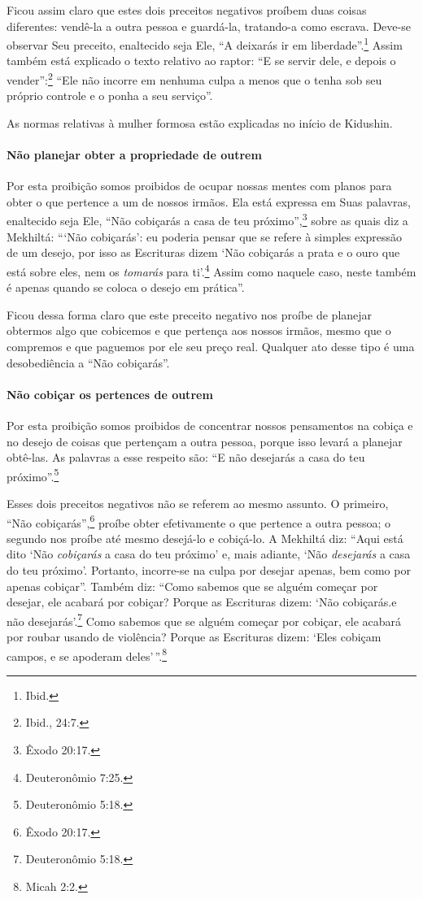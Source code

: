 Ficou assim claro que estes dois preceitos negativos proíbem duas coisas
diferentes: vendê-la a outra pessoa e guardá-la, tratando-a como
escrava. Deve-se observar Seu preceito, enaltecido seja Ele, ``A
deixarás ir em liberdade''.\footnote{Ibid.} Assim também está explicado o texto
relativo ao raptor: ``E se servir dele, e depois o vender'':\footnote{Ibid.,
24:7.} ``Ele não incorre em nenhuma culpa a menos que o tenha sob seu
próprio controle e o ponha a seu serviço''.

As normas relativas à mulher formosa estão explicadas no início de Kidushin.

\paragraph{Não planejar obter a propriedade de outrem}

Por esta proibição somos proibidos de ocupar nossas mentes com planos
para obter o que pertence a um de nossos irmãos. Ela está expressa em
Suas palavras, enaltecido seja Ele, ``Não cobiçarás a casa de teu
próximo'',\footnote{Êxodo 20:17.} sobre as quais diz a Mekhiltá: ```Não
cobiçarás': eu poderia pensar que se refere à simples expressão de um
desejo, por isso as Escrituras dizem `Não cobiçarás a prata e o ouro que
está sobre eles, nem os \emph{tomarás} para ti'.\footnote{Deuteronômio 7:25.}
Assim como naquele caso, neste também é apenas quando se coloca o
desejo em prática''.

Ficou dessa forma claro que este preceito negativo nos proíbe de
planejar obtermos algo que cobicemos e que pertença aos nossos irmãos,
mesmo que o compremos e que paguemos por ele seu preço real. Qualquer
ato desse tipo é uma desobediência a ``Não cobiçarás''.

\paragraph{Não cobiçar os pertences de outrem}

Por esta proibição somos proibidos de concentrar nossos pensamentos na
cobiça e no desejo de coisas que pertençam a outra pessoa, porque isso
levará a planejar obtê-las. As palavras a esse respeito são: ``E não
desejarás a casa do teu próximo''.\footnote{Deuteronômio 5:18.}

Esses dois preceitos negativos não se referem ao mesmo assunto. O
primeiro, ``Não cobiçarás'',\footnote{Êxodo 20:17.} proíbe obter efetivamente o
que pertence a outra pessoa; o segundo nos proíbe até mesmo desejá-lo e
cobiçá-lo. A Mekhiltá diz: ``Aqui está dito `Não \emph{cobiçarás} a casa
do teu próximo' e, mais adiante, `Não \emph{desejarás} a casa do teu
próximo'. Portanto, incorre-se na culpa por desejar apenas, bem como por
apenas cobiçar''. Também diz: ``Como sabemos que se alguém começar por
desejar, ele acabará por cobiçar? Porque as Escrituras dizem: `Não
cobiçarás.e não desejarás'.\footnote{Deuteronômio 5:18.} Como sabemos que se
alguém começar por cobiçar, ele acabará por roubar usando de violência?
Porque as Escrituras dizem: `Eles cobiçam campos, e se apoderam
deles'\,''.\footnote{Micah 2:2.}

